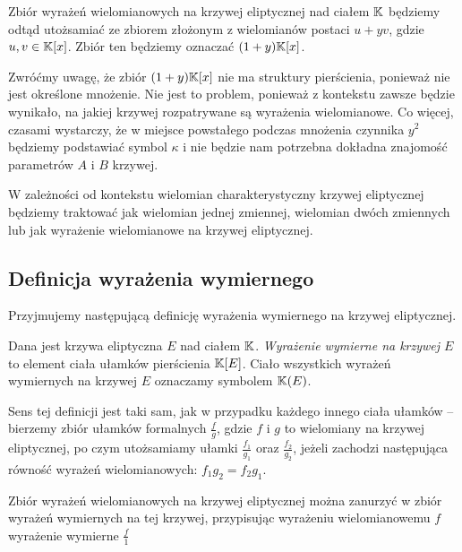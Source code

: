 \begin{remark}
Zbiór wyrażeń wielomianowych na krzywej eliptycznej nad ciałem $\mathbb{K}$
będziemy odtąd utożsamiać ze zbiorem
złożonym z wielomianów postaci $u + yv$,
gdzie $u, v \in \mathbb{K}[x]$.
Zbiór ten będziemy oznaczać $(1 + y)\mathbb{K}[x]$.
\end{remark}

\noindent
Zwróćmy uwagę, że zbiór $(1 + y)\mathbb{K}[x]$ nie ma struktury pierścienia,
ponieważ nie jest określone mnożenie.
Nie jest to problem,
ponieważ z kontekstu zawsze będzie wynikało,
na jakiej krzywej rozpatrywane są wyrażenia wielomianowe.
Co więcej, czasami wystarczy,
że w miejsce powstałego podczas mnożenia czynnika $y^2$
będziemy podstawiać symbol $\kappa$
i nie będzie nam potrzebna dokładna znajomość parametrów $A$ i $B$ krzywej.

\begin{remark}
W zależności od kontekstu wielomian charakterystyczny krzywej eliptycznej
będziemy traktować jak wielomian jednej zmiennej, wielomian dwóch zmiennych
lub jak wyrażenie wielomianowe na krzywej eliptycznej.
\end{remark}

\subsection*{Definicja wyrażenia wymiernego}

\noindent
Przyjmujemy następującą definicję
wyrażenia wymiernego na krzywej eliptycznej.

\begin{definition}
Dana jest krzywa eliptyczna $E$ nad ciałem $\mathbb{K}$.
\emph{Wyrażenie wymierne na krzywej $E$}
to element ciała ułamków pierścienia $\mathbb{K}[E]$.
Ciało wszystkich wyrażeń wymiernych na krzywej $E$
oznaczamy symbolem $\mathbb{K}(E)$.
\end{definition}

\noindent
Sens tej definicji jest taki sam,
jak w przypadku każdego innego ciała ułamków --
bierzemy zbiór ułamków formalnych $\frac{f}{g}$,
gdzie $f$ i $g$ to wielomiany na krzywej eliptycznej,
po czym utożsamiamy ułamki $\frac{f_1}{g_1}$ oraz $\frac{f_2}{g_2}$,
jeżeli zachodzi następująca równość wyrażeń wielomianowych:
$f_1g_2 = f_2g_1$.

\begin{fact}
Zbiór wyrażeń wielomianowych na krzywej eliptycznej
można zanurzyć w zbiór wyrażeń wymiernych na tej krzywej,
przypisując wyrażeniu wielomianowemu $f$ wyrażenie wymierne $\frac{f}{1}$
\end{fact}

